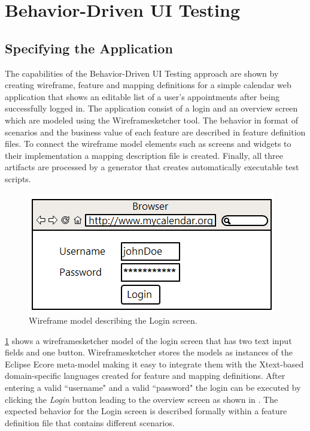 \documentclass{sig-alternate-05-2015}
\begin{document}
\section{Behavior-Driven UI Testing}\label{sec:BehaviorDrivenUITesting}
\subsection{Specifying the Application}\label{sec:SpecifyingTheApplication} 
The capabilities of the Behavior-Driven UI Testing approach are shown by creating wireframe, feature and mapping definitions for a simple calendar web application that shows an editable list of a user's appointments after being successfully logged in.
The application consist of a login and an overview screen which are modeled using the Wireframesketcher tool.
The behavior in format of scenarios and the business value of each feature are described in feature definition files.
To connect the wireframe model elements such as screens and widgets to their implementation a mapping description file is created.
Finally, all three artifacts are processed by a generator that creates automatically executable test scripts.

\begin{figure}[h]
	\centering
	\includegraphics[width=0.8\linewidth]{Login.png}
	\caption{Wireframe model describing the Login screen.}
	\label{fig:login}
\end{figure}

\cref{fig:login} shows a wireframesketcher model of the login screen that has two text input fields and one button.
Wireframesketcher stores the models as instances of the Eclipse Ecore meta-model \cite{SBPM09} making it easy to integrate them with the Xtext-based domain-specific languages created for feature and mapping definitions.
After entering a valid ``username" and a valid ``password" the login can be executed by clicking the \textit{Login} button leading to the overview screen as shown in .
The expected behavior for the Login screen is described formally within a feature definition file that contains different scenarios.
\end{document}
